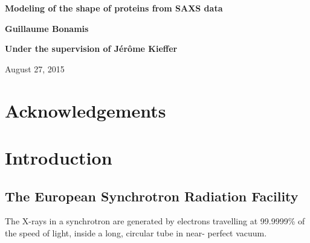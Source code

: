 \documentclass[a4paper, 11pt]{report}
\begin{document}
\begin{titlepage}
    \parindent=0pt
    \hrulefill
    \begin{center}\bfseries\Huge
        Modeling of the shape of proteins from SAXS data
    \end{center}

    \hrulefill
    \vspace*{1cm}
    \begin{center}\bfseries\Large           %
        Guillaume Bonamis
    \end{center}

    \begin{center}\bfseries\Large           %
        Under the supervision of J\'er\^ome Kieffer
    \end{center}

    \begin{flushright}
        August 27, 2015
    \end{flushright}   
    
\end{titlepage}


\chapter*{Acknowledgements}


\tableofcontents
{}


\chapter{Introduction}

\section{The European Synchrotron Radiation Facility}

The X-rays in a synchrotron are generated by electrons travelling at 
99.9999\% of the speed of light, inside a long, circular tube in near-
perfect vacuum.\\
\end{document}

